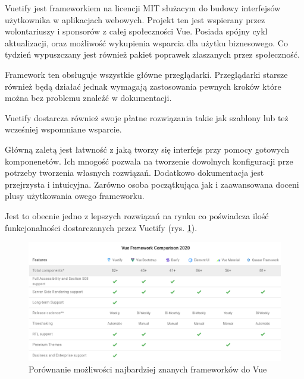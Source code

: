 Vuetify jest frameworkiem na licencji MIT  służacym do budowy interfejsów użytkownika w aplikacjach webowych. Projekt ten jest wspierany przez wolontariuszy i sponsorów z całej społeczności Vue. Posiada spójny cykl aktualizacji, oraz możliwość wykupienia wsparcia dla użytku biznesowego. Co tydzień wypuszczany jest również pakiet poprawek złaszanych przez społeczność.

Framework ten obsługuje wszystkie główne przeglądarki. Przeglądarki starsze również będą działać jednak wymagają zastosowania pewnych kroków które można bez problemu znaleźć w dokumentacji.

Vuetify dostarcza również swoje płatne rozwiązania takie jak szablony lub też wcześniej wspomniane wsparcie.

Główną zaletą jest łatwność z jaką tworzy się interfejs przy pomocy gotowych komponenetów. Ich mnogość pozwala na tworzenie dowolnych konfiguracji prze potrzeby tworzenia własnych rozwiązań. Dodatkowo dokumentacja jest przejrzysta i intuicyjna. Zarówno osoba początkująca jak i zaawansowana doceni plusy użytkowania owego frameworku.

Jest to obecnie jedno z lepszych rozwiązań na rynku co poświadcza ilość funkcjonalności dostarczanych przez Vuetify (rys. \ref{fig:vuetifyjs}).

\begin{figure}[H]
    \centering
    \includegraphics[width=6in]{images/vuetifyjs.png}
    \caption{Porównanie możliwości najbardziej znanych frameworków do Vue \label{fig:vuetifyjs}}
\end{figure}